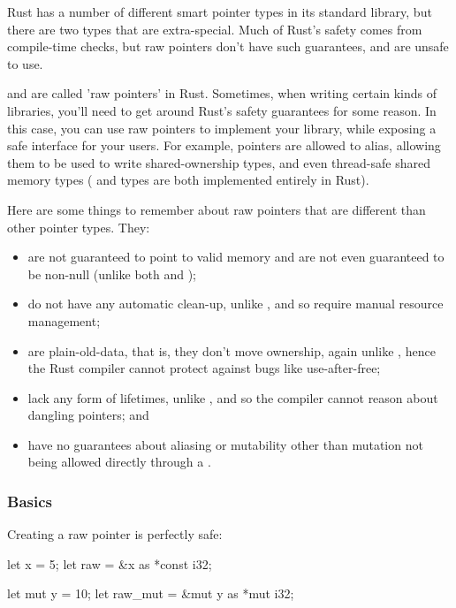 Rust has a number of different smart pointer types in its standard library, but there are two types that are extra-special. Much 
of Rust's safety comes from compile-time checks, but raw pointers don't have such guarantees, and are unsafe to use.

\blank

 and  are called 'raw pointers' in Rust. Sometimes, when writing certain kinds of libraries, you'll 
need to get around Rust's safety guarantees for some reason. In this case, you can use raw pointers to implement your library, 
while exposing a safe interface for your users. For example, \code{*} pointers are allowed to alias, allowing them to be used to 
write shared-ownership types, and even thread-safe shared memory types ( and  types are both implemented 
entirely in Rust).

\blank

Here are some things to remember about raw pointers that are different than other pointer types. They:

\begin{itemize}
  \item{are not guaranteed to point to valid memory and are not even guaranteed to be non-null (unlike both  and \code{\&});}
  \item{do not have any automatic clean-up, unlike , and so require manual resource management;}
  \item{are plain-old-data, that is, they don't move ownership, again unlike , hence the Rust compiler cannot protect against 
      bugs like use-after-free;}
  \item{lack any form of lifetimes, unlike \code{\&}, and so the compiler cannot reason about dangling pointers; and}
  \item{have no guarantees about aliasing or mutability other than mutation not being allowed directly through a .}
\end{itemize}

\subsubsection*{Basics}

Creating a raw pointer is perfectly safe:

\begin{rustc}
let x = 5;
let raw = &x as *const i32;

let mut y = 10;
let raw_mut = &mut y as *mut i32;
\end{rustc}

